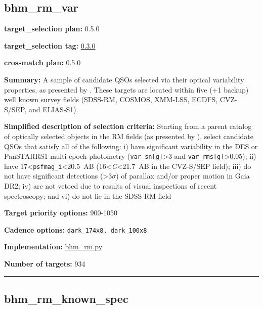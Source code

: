 \hypertarget{bhm_rm_var_plan0.5.0}{%
\subsection{bhm\_rm\_var}\label{bhm_rm_var_plan0.5.0}}

\noindent\textbf{target\_selection plan:} 0.5.0

\noindent\textbf{target\_selection tag:}
\href{https://github.com/sdss/target_selection/tree/0.3.0/}{0.3.0}

\noindent\textbf{crossmatch plan:} 0.5.0

\noindent\textbf{Summary:} A sample of candidate QSOs selected via their optical
variability properties, as presented by
\citet{Yang2022}. These targets are located within five (+1 backup) well
known survey fields (SDSS-RM, COSMOS, XMM-LSS, ECDFS, CVZ-S/SEP, and
ELIAS-S1).

\noindent\textbf{Simplified description of selection criteria:} Starting from a
parent catalog of optically selected objects in the RM fields (as
presented by
\citealt{Yang2022}), select candidate QSOs that satisfy all of the
following: i) have significant variability in the DES or PanSTARRS1
multi-epoch photometry (\texttt{var\_sn{[}g{]}}\textgreater3 and
\texttt{var\_rms{[}g{]}}\textgreater0.05); ii) have
17\textless{}\texttt{psfmag\_i}\textless20.5~AB
(16\textless{}\emph{G}\textless21.7~AB in the CVZ-S/SEP field); iii) do
not have significant detections (\textgreater3$\sigma$) of parallax and/or
proper motion in Gaia DR2; iv) are not vetoed due to results of visual
inspections of recent spectroscopy; and vi) do not lie in the SDSS-RM
field


\noindent\textbf{Target priority options:} 900-1050

\noindent\textbf{Cadence options:} \texttt{dark\_174x8,\ dark\_100x8}

\noindent\textbf{Implementation:}
\href{https://github.com/sdss/target_selection/blob/0.3.0/python/target_selection/cartons/bhm_rm.py}{bhm\_rm.py}

\noindent\textbf{Number of targets:} 934

\begin{center}\rule{0.5\linewidth}{0.5pt}\end{center}

\hypertarget{bhm_rm_known_spec_plan0.5.0}{%
\subsection{bhm\_rm\_known\_spec}\label{bhm_rm_known_spec_plan0.5.0}}

